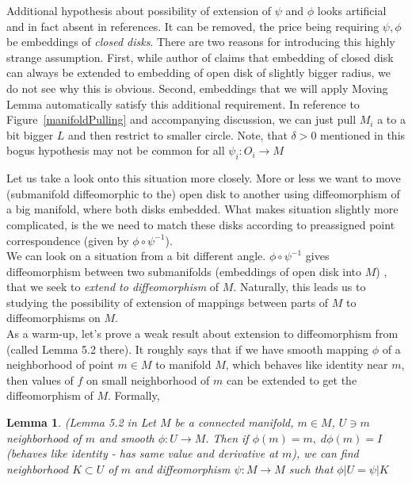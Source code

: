 \documentclass[8pt]{article} %
\newtheorem{lemma}[theorem]{Lemma}
\newenvironment{remark}[1][Remark]{\begin{trivlist}
\item[\hskip \labelsep {\bfseries #1}]}{\end{trivlist}}
\begin{document}
\begin{remark}
	\label{BogusHypothesis}
	Additional hypothesis about possibility of extension of $\psi$ and $\phi$ looks artificial and in fact absent in references. It can
	be removed, the price being requiring $\psi,\phi$ be embeddings of \textit{closed disks}. There are two reasons for introducing this highly
	strange assumption. First, while author of \cite{palaisInner} claims that embedding of closed disk can always be extended to embedding of
	open disk of slightly bigger radius, we do not see why this is obvious. Second, embeddings that we will apply Moving Lemma automatically
	satisfy this additional requirement. In reference to Figure~\ref{manifoldPulling} and accompanying discussion,
	we can just pull $M_i$ a to a bit bigger $L$ and then restrict to smaller circle. Note, that $\delta>0$ mentioned in this bogus hypothesis
	may not be common for all $\psi_i:O_i\to M$
\end{remark}
Let us take a look onto this situation more closely. More or less we want to move (submanifold diffeomorphic to the) open disk to another using
diffeomorphism of a big manifold, where both disks embedded. What makes situation slightly more complicated, is the we need to match these
disks according to preassigned point correspondence (given by $\phi\circ\psi^{-1}$).\\
We can look on a situation from a bit different angle.
$\phi\circ\psi^{-1}$ gives diffeomorphism between two submanifolds (embeddings of open disk into $M$)
, that we seek to \textit{extend to diffeomorphism} of $M$. Naturally, this leads us to studying the possibility of
extension of mappings between parts of $M$ to
diffeomorphisms on $M$.\\
As a warm-up, let's prove a weak result about extension to diffeomorphism
from \cite{palaisInner} (called Lemma 5.2 there). It roughly says that if we have smooth mapping $\phi$ of a neighborhood of point $m\in M$ to manifold
$M$, which behaves like identity near $m$, then values
of $f$ on small neighborhood of $m$ can be extended to get the diffeomorphism of $M$. Formally,
\begin{lemma}{(Lemma 5.2 in \cite{palaisInner}}\label{identExtension} Let $M$ be a connected manifold, $m\in M$, $U\ni m$ neighborhood of $m$ and smooth $\phi:U\rightarrow M$. Then if $\phi(m)=m,\;d\phi(m)=I$ (behaves like identity - 
	has same value and derivative at $m$), we can find
	neighborhood $K\subset U$ of $m$ and diffeomorphism $\psi:M\rightarrow M$ such that $\phi|U=\psi|K$
\end{lemma}
\end{document}
